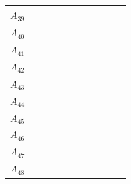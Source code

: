\documentclass[11pt]{report}
\begin{document}
\begin{table}[h!]
\begin{tabular}{| c | c | c | c | c | c | c | c | c | c | c |}
    \small{$A_{39}$} & \cellcolor{train} & \cellcolor{train} & \cellcolor{train} & \cellcolor{train} & \cellcolor{train} & \cellcolor{train} & \cellcolor{train} & \cellcolor{test}  & \cellcolor{train} &  \cellcolor{train} \\ \hline
    \small{$A_{40}$} & \cellcolor{test}  & \cellcolor{train} & \cellcolor{train} & \cellcolor{train} & \cellcolor{train} & \cellcolor{train} & \cellcolor{train} & \cellcolor{train} & \cellcolor{train} &  \cellcolor{train} \\ \hline
    \small{$A_{41}$} & \cellcolor{train} & \cellcolor{train} & \cellcolor{test}  & \cellcolor{test}  & \cellcolor{train} & \cellcolor{train} & \cellcolor{train} & \cellcolor{train} & \cellcolor{train} &  \cellcolor{train} \\ \hline
    \small{$A_{42}$} & \cellcolor{train} & \cellcolor{train} & \cellcolor{train} & \cellcolor{train} & \cellcolor{train} & \cellcolor{test}  & \cellcolor{train} & \cellcolor{train} & \cellcolor{test}  &  \cellcolor{train} \\ \hline
    \small{$A_{43}$} & \cellcolor{train} & \cellcolor{train} & \cellcolor{train} & \cellcolor{train} & \cellcolor{train} & \cellcolor{train} & \cellcolor{train} & \cellcolor{test}  & \cellcolor{train} & \cellcolor{test}  \\ \hline
    \small{$A_{44}$} & \cellcolor{test}  & \cellcolor{train} & \cellcolor{train} & \cellcolor{train} & \cellcolor{train} & \cellcolor{test}  & \cellcolor{train} & \cellcolor{test}  & \cellcolor{train} &  \cellcolor{train} \\ \hline
    \small{$A_{45}$} & \cellcolor{train} & \cellcolor{train} & \cellcolor{train} & \cellcolor{train} & \cellcolor{train} & \cellcolor{test}  & \cellcolor{train} & \cellcolor{train} & \cellcolor{train} &  \cellcolor{train} \\ \hline
    \small{$A_{46}$} & \cellcolor{train} & \cellcolor{train} & \cellcolor{train} & \cellcolor{train} & \cellcolor{train} & \cellcolor{train} & \cellcolor{train} & \cellcolor{train} & \cellcolor{train} &  \cellcolor{train} \\ \hline
    \small{$A_{47}$} & \cellcolor{train} & \cellcolor{train} & \cellcolor{train} & \cellcolor{train} & \cellcolor{train} & \cellcolor{train} & \cellcolor{train} & \cellcolor{test}  & \cellcolor{train} &  \cellcolor{train} \\ \hline
    \small{$A_{48}$} & \cellcolor{train} & \cellcolor{train} & \cellcolor{train} & \cellcolor{train} & \cellcolor{train} & \cellcolor{train} & \cellcolor{train} & \cellcolor{train} & \cellcolor{train} &  \cellcolor{train} \\ \hline

\end{tabular}
\end{table}
\end{document}

